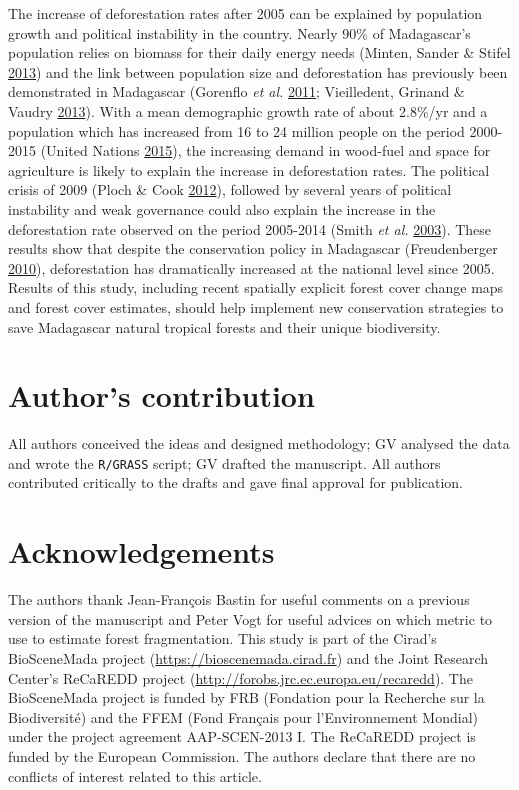 \documentclass[]{article}
\theoremstyle{definition}
\theoremstyle{definition}
\theoremstyle{definition}
\theoremstyle{remark}
\begin{document}
The increase of deforestation rates after 2005 can be explained by
population growth and political instability in the country. Nearly 90\%
of Madagascar's population relies on biomass for their daily energy
needs (Minten, Sander \& Stifel
\protect\hyperlink{ref-Minten2013}{2013}) and the link between
population size and deforestation has previously been demonstrated in
Madagascar (Gorenflo \emph{et al.}
\protect\hyperlink{ref-Gorenflo2011}{2011}; Vieilledent, Grinand \&
Vaudry \protect\hyperlink{ref-Vieilledent2013}{2013}). With a mean
demographic growth rate of about 2.8\%/yr and a population which has
increased from 16 to 24 million people on the period 2000-2015 (United
Nations \protect\hyperlink{ref-UN2015}{2015}), the increasing demand in
wood-fuel and space for agriculture is likely to explain the increase in
deforestation rates. The political crisis of 2009 (Ploch \& Cook
\protect\hyperlink{ref-Ploch2012}{2012}), followed by several years of
political instability and weak governance could also explain the
increase in the deforestation rate observed on the period 2005-2014
(Smith \emph{et al.} \protect\hyperlink{ref-Smith2003}{2003}). These
results show that despite the conservation policy in Madagascar
(Freudenberger \protect\hyperlink{ref-Freudenberger2010}{2010}),
deforestation has dramatically increased at the national level since
2005. Results of this study, including recent spatially explicit forest
cover change maps and forest cover estimates, should help implement new
conservation strategies to save Madagascar natural tropical forests and
their unique biodiversity.

\hypertarget{authors-contribution}{%
\section{Author's contribution}\label{authors-contribution}}

All authors conceived the ideas and designed methodology; GV analysed
the data and wrote the \texttt{R/GRASS} script; GV drafted the
manuscript. All authors contributed critically to the drafts and gave
final approval for publication.

\hypertarget{acknowledgements}{%
\section{Acknowledgements}\label{acknowledgements}}

The authors thank Jean-François Bastin for useful comments on a previous
version of the manuscript and Peter Vogt for useful advices on which
metric to use to estimate forest fragmentation. This study is part of
the Cirad's BioSceneMada project (\url{https://bioscenemada.cirad.fr})
and the Joint Research Center's ReCaREDD project
(\url{http://forobs.jrc.ec.europa.eu/recaredd}). The BioSceneMada
project is funded by FRB (Fondation pour la Recherche sur la
Biodiversité) and the FFEM (Fond Français pour l'Environnement Mondial)
under the project agreement AAP-SCEN-2013 I. The ReCaREDD project is
funded by the European Commission. The authors declare that there are no
conflicts of interest related to this article.
\end{document}
